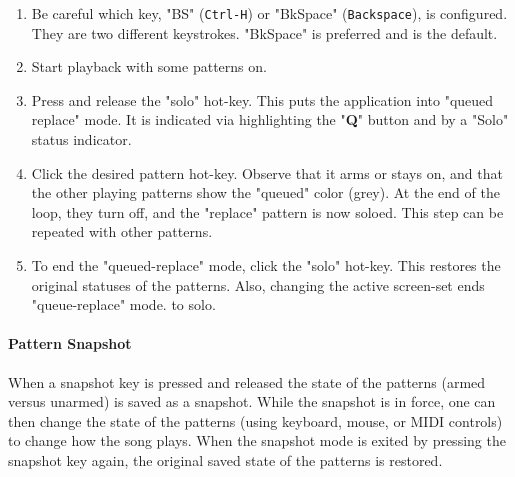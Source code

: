    \begin{enumerate}
      \item Be careful which key, "BS" (\texttt{Ctrl-H})
         or "BkSpace" (\texttt{Backspace}), is configured.
         They are two different keystrokes. "BkSpace" 
         is preferred and is the default.
      \item Start playback with some patterns on. 
      \item Press and release
         the "solo" hot-key.  This puts the application into
         "queued replace" mode.
         It is indicated via highlighting the "\textbf{Q}" button
         and by a "Solo" status indicator.
      \item Click the desired pattern hot-key.  Observe that it arms or
         stays on, and that the other playing patterns show the "queued" color
         (grey).  At the end of the loop, they turn off, and the "replace"
         pattern is now soloed.
         This step can be repeated with other patterns.
      \item To end
         the "queued-replace" mode, click the "solo" hot-key.
         This restores the original statuses of the patterns.
         Also, changing the active screen-set ends "queue-replace"
         mode.
         to solo.
   \end{enumerate}

\paragraph{Pattern Snapshot}
\label{paragraph:patterns_pattern_snapshot}

   When a snapshot key is pressed and released the state of the patterns
   (armed versus unarmed) is saved as a snapshot.
   While the snapshot is in force, one can then change the state of the patterns
   (using keyboard, mouse, or MIDI controls) to change how the song plays.
   When the snapshot mode is exited by pressing the snapshot key again, the
   original saved state of the patterns is restored.

